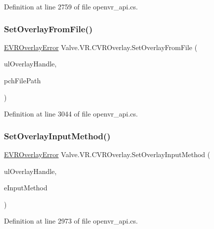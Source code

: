 Definition at line 2759 of file openvr\+\_\+api.\+cs.

\mbox{\label{class_valve_1_1_v_r_1_1_c_v_r_overlay_a39816b5a3dd5dbfb23ac888bd3ce0e7f}} 
\subsubsection{\texorpdfstring{SetOverlayFromFile()}{SetOverlayFromFile()}}
{\footnotesize\ttfamily \mbox{\hyperlink{namespace_valve_1_1_v_r_aaee5c5144f42b7969d45b854f51b0c18}{E\+V\+R\+Overlay\+Error}} Valve.\+V\+R.\+C\+V\+R\+Overlay.\+Set\+Overlay\+From\+File (\begin{DoxyParamCaption}\item[{ulong}]{ul\+Overlay\+Handle,  }\item[{string}]{pch\+File\+Path }\end{DoxyParamCaption})}



Definition at line 3044 of file openvr\+\_\+api.\+cs.

\mbox{\label{class_valve_1_1_v_r_1_1_c_v_r_overlay_a721f82585ced5b9cacbfebb58152c368}} 
\subsubsection{\texorpdfstring{SetOverlayInputMethod()}{SetOverlayInputMethod()}}
{\footnotesize\ttfamily \mbox{\hyperlink{namespace_valve_1_1_v_r_aaee5c5144f42b7969d45b854f51b0c18}{E\+V\+R\+Overlay\+Error}} Valve.\+V\+R.\+C\+V\+R\+Overlay.\+Set\+Overlay\+Input\+Method (\begin{DoxyParamCaption}\item[{ulong}]{ul\+Overlay\+Handle,  }\item[{\mbox{\hyperlink{namespace_valve_1_1_v_r_a43f4e4c6980efb8b0d2a954640203d74}{V\+R\+Overlay\+Input\+Method}}}]{e\+Input\+Method }\end{DoxyParamCaption})}



Definition at line 2973 of file openvr\+\_\+api.\+cs.

